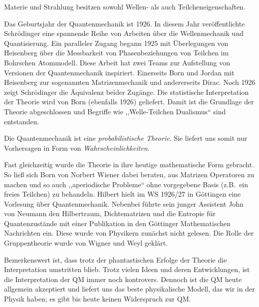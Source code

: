 \begin{center}
\parbox[c][5cm][c]{14cm}{\begin{tcolorbox}[colback=banana,arc=0cm,frame hidden,enhanced]Materie und Strahlung besitzen sowohl Wellen- als auch Teilcheneigenschaften.\end{tcolorbox}}
\end{center}



Das Geburtsjahr der Quantenmechanik ist 1926. In diesem Jahr veröffentlichte Schrödinger eine spannende Reihe von Arbeiten über die Wellenmechanik und Quantisierung. Ein paralleler Zugang begann 1925 mit Überlegungen von Heisenberg über die Messbarkeit von Phasenbeziehungen von Teilchen im Bohrschen Atommodell. Diese Arbeit hat zwei Teams zur Aufstellung von Versionen der Quantenmechanik inspiriert. Einerseits Born und Jordan mit Heisenberg zur sogenannten Matrizenmechanik und andererseits Dirac. Noch 1926 zeigt Schrödinger die Äquivalenz beider Zugänge. Die statistische Interpretation der Theorie wird von Born (ebenfalls 1926) geliefert. Damit ist die Grundlage der Theorie abgeschlossen und Begriffe wie ,,Welle-Teilchen Dualismus`` sind entstanden. 

\begin{center}
\parbox[c][5cm][c]{14cm}{\begin{tcolorbox}[colback=banana,arc=0cm,frame hidden,enhanced]Die Quantenmechanik ist eine \emph{probabilistische Theorie}. Sie liefert uns somit nur Vorhersagen in Form von \emph{Wahrscheinlichkeiten}.\end{tcolorbox}}
\end{center}

Fast gleichzeitig wurde die Theorie in ihre heutige mathematische Form gebracht. So ließ sich Born von Norbert Wiener dabei beraten, aus Matrizen Operatoren zu machen und so auch ,,aperiodische Probleme`` ohne vorgegebene Basis (z.B.\ ein freies Teilchen) zu behandeln. Hilbert hielt im WS 1926/27 in Göttingen eine Vorlesung über Quantenmechanik. Nebenbei führte sein junger Assistent John von Neumann den Hilbertraum, Dichtematrizen und die Entropie für Quantenzustände mit einer Publikation in den Göttinger Mathematischen Nachrichten ein. Diese wurde von Physikern zunächst nicht gelesen. Die Rolle der Gruppentheorie wurde von Wigner und Weyl geklärt.

Bemerkenswert ist, dass trotz der phantastischen Erfolge der Theorie die Interpretation umstritten blieb. Trotz vielen Ideen und deren Entwicklungen, ist die Interpretation der QM immer noch kontrovers. Dennoch ist die QM heute allgemein akzeptiert und liefert uns das beste physikalische Modell, das wir in der Physik haben; es gibt bis heute keinen Widerspruch zur QM. 

